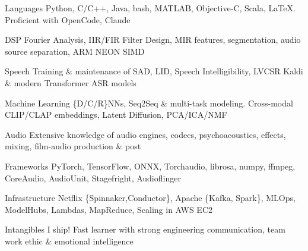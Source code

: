 

\begin{cvskills}

  \cvskill
    {Languages} %
    {Python, C/C++, Java, bash, MATLAB, Objective-C, Scala, LaTeX. Proficient with OpenCode, Claude}

  \cvskill
    {DSP} %
    {Fourier Analysis, IIR/FIR Filter Design, MIR features, segmentation, audio source separation, ARM NEON SIMD} %
    
  \cvskill
    {Speech} %
    {Training \& maintenance of SAD, LID, Speech Intelligibility, LVCSR Kaldi \& modern Transformer ASR models} %

  \cvskill
    {Machine Learning} %
    {\{D/C/R\}NNs, Seq2Seq \& multi-task modeling. Cross-modal CLIP/CLAP embeddings, Latent Diffusion, PCA/ICA/NMF} %
       
  \cvskill
    {Audio} %
    {Extensive knowledge of audio engines, codecs, psychoacoustics, effects, mixing, film-audio production \& post} %

  \cvskill
    {Frameworks} %
    {PyTorch, TensorFlow, ONNX, Torchaudio, librosa, numpy, ffmpeg, CoreAudio, AudioUnit, Stagefright, Audioflinger} %

  \cvskill
    {Infrastructure} %
    {Netflix \{Spinnaker,Conductor\}, Apache \{Kafka, Spark\}, MLOps, ModelHubs, Lambdas, MapReduce, Scaling in AWS EC2} %

  \cvskill
    {Intangibles} %
    {I ship! Fast learner with strong engineering communication, team work ethic \& emotional intelligence} %



\end{cvskills}


